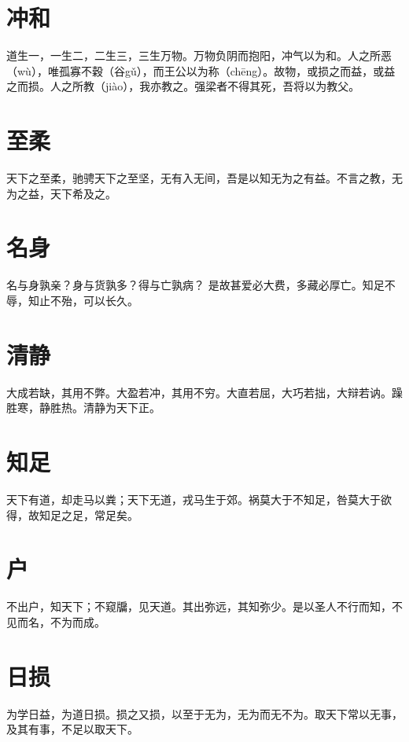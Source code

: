 \documentclass[a4paper,12pt,UTF8,twoside]{ctexbook}
\begin{document}
	
	\chapter{冲和}
	道生一，一生二，二生三，三生万物。万物负阴而抱阳，冲气以为和。人之所恶（wù），唯孤寡不穀（谷gǔ），而王公以为称（chēng）。故物，或损之而益，或益之而损。人之所教（jiào），我亦教之。强梁者不得其死，吾将以为教父。
	
	
	
	\chapter{至柔}
	天下之至柔，驰骋天下之至坚，无有入无间，吾是以知无为之有益。不言之教，无为之益，天下希及之。
	
	
	
	
	\chapter{名身}
	名与身孰亲？身与货孰多？得与亡孰病？ 是故甚爱必大费，多藏必厚亡。知足不辱，知止不殆，可以长久。
	
	
	
	
	\chapter{清静}
	大成若缺，其用不弊。大盈若冲，其用不穷。大直若屈，大巧若拙，大辩若讷。躁胜寒，静胜热。清静为天下正。
	
	
	
	
	\chapter{知足}
	天下有道，却走马以粪；天下无道，戎马生于郊。祸莫大于不知足，咎莫大于欲得，故知足之足，常足矣。
	
	
	
	
	\chapter{户}
	不出户，知天下；不窥牖，见天道。其出弥远，其知弥少。是以圣人不行而知，不见而名，不为而成。
	
	

	\chapter{日损}
		
	为学日益，为道日损。损之又损，以至于无为，无为而无不为。取天下常以无事，及其有事，不足以取天下。
	
\end{document}
